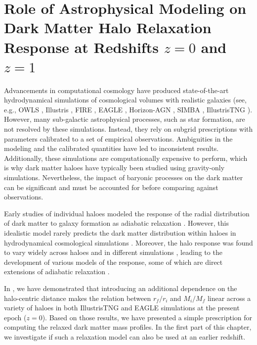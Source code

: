 \chapter[Role of Astrophysical Modeling at z=0 and z=1]{Role of Astrophysical Modeling on Dark Matter Halo Relaxation Response at Redshifts $z=0$ and $z=1$}
\label{chap:physvar_z01}

Advancements in computational cosmology have produced state-of-the-art hydrodynamical simulations of cosmological volumes with realistic galaxies (see, e.g., OWLS \citep{2010MNRAS.402.1536S}, Illustris \citep{2014MNRAS.445..175G}, FIRE \citep{2014MNRAS.445..581H}, EAGLE \citep{2015MNRAS.446..521S}, Horizon-AGN \citep[][]{2017MNRAS.467.4739K}, SIMBA \citep[][]{2019MNRAS.486.2827D}, IllustrisTNG \citep{2019ComAC...6....2N}). However, many sub-galactic astrophysical processes, such as star formation, are not resolved by these simulations. Instead, they rely on subgrid prescriptions with parameters calibrated to a set of empirical observations. Ambiguities in the modeling and the calibrated quantities have led to inconsistent results. Additionally, these simulations are computationally expensive to perform, which is why dark matter haloes have typically been studied using gravity-only simulations. Nevertheless, the impact of baryonic processes on the dark matter can be significant and must be accounted for before comparing against observations.

Early studies of individual haloes modeled the response of the radial distribution of dark matter to galaxy formation as adiabatic relaxation \citep[][]{osti6457593,1984MNRAS.211..753B,1986ApJ...301...27B,1987ApJ...318...15R}. However, this idealistic model rarely predicts the dark matter distribution within haloes in hydrodynamical cosmological simulations \citep[e.g.,][]{2004ApJ...616...16G,2010MNRAS.407..435A}. Moreover, the halo response was found to vary widely across haloes and in different simulations \citep[][]{2004ApJ...616...16G,2006PhRvD..74l3522G,2010MNRAS.402..776P,2010MNRAS.406..922T,2010MNRAS.405.2161D,2010MNRAS.407..435A,2011MNRAS.414..195T,2016MNRAS.461.2658D,2019A&A...622A.197A,2022MNRAS.511.3910F,2023Velmani&Paranjape}, leading to the development of various models of the response, some of which are direct extensions of adiabatic relaxation \citep[e.g.,][]{2004ApJ...616...16G,2006PhRvD..74l3522G,2010MNRAS.407..435A}. ~

In , we have demonstrated that introducing an additional dependence on the halo-centric distance makes the relation between $r_f/r_i$ and $M_i/M_f$ linear across a variety of haloes in both IllustrisTNG and EAGLE simulations at the present epoch ($z=0$). Based on those results, we have presented a simple prescription for computing the relaxed dark matter mass profiles. In the first part of this chapter, we investigate if such a relaxation model can also be used at an earlier redshift.

